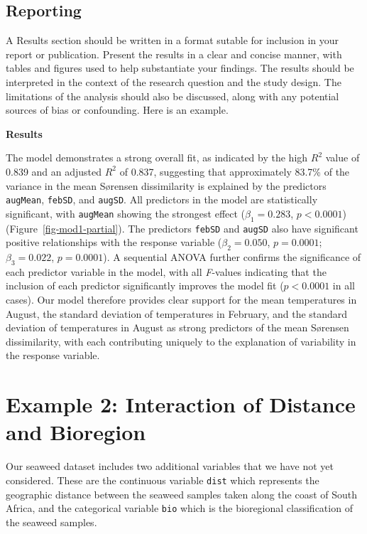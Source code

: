 \documentclass[
  letterpaper,
]{book}
\begin{document}
\subsection{Reporting}\label{reporting-1}

A Results section should be written in a format sutable for inclusion in
your report or publication. Present the results in a clear and concise
manner, with tables and figures used to help substantiate your findings.
The results should be interpreted in the context of the research
question and the study design. The limitations of the analysis should
also be discussed, along with any potential sources of bias or
confounding. Here is an example.

\textbf{Results}

The model demonstrates a strong overall fit, as indicated by the high
\(R^2\) value of 0.839 and an adjusted \(R^2\) of 0.837, suggesting that
approximately 83.7\% of the variance in the mean Sørensen dissimilarity
is explained by the predictors \texttt{augMean}, \texttt{febSD}, and
\texttt{augSD}. All predictors in the model are statistically
significant, with \texttt{augMean} showing the strongest effect
(\(\beta_1 = 0.283\), \(p < 0.0001\)) (Figure~\ref{fig-mod1-partial}).
The predictors \texttt{febSD} and \texttt{augSD} also have significant
positive relationships with the response variable (\(\beta_2 = 0.050\),
\(p = 0.0001\); \(\beta_3 = 0.022\), \(p = 0.0001\)). A sequential ANOVA
further confirms the significance of each predictor variable in the
model, with all \emph{F}-values indicating that the inclusion of each
predictor significantly improves the model fit (\(p < 0.0001\) in all
cases). Our model therefore provides clear support for the mean
temperatures in August, the standard deviation of temperatures in
February, and the standard deviation of temperatures in August as strong
predictors of the mean Sørensen dissimilarity, with each contributing
uniquely to the explanation of variability in the response variable.

\section{Example 2: Interaction of Distance and
Bioregion}\label{sec-mlr-interaction}

Our seaweed dataset includes two additional variables that we have not
yet considered. These are the continuous variable \texttt{dist} which
represents the geographic distance between the seaweed samples taken
along the coast of South Africa, and the categorical variable
\texttt{bio} which is the bioregional classification of the seaweed
samples.
\end{document}

